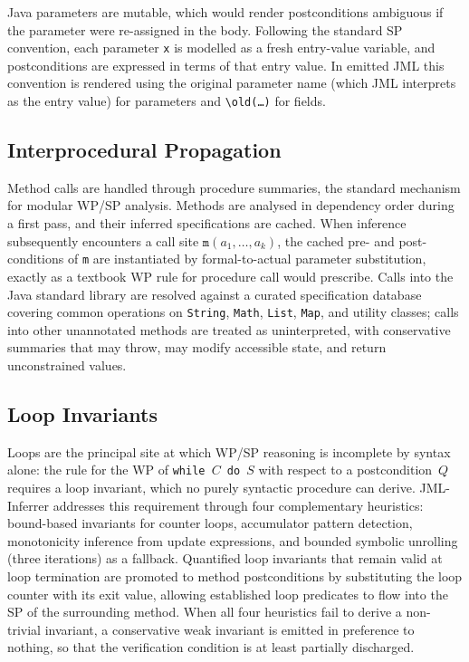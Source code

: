 \documentclass[11pt]{article}
\begin{document}
Java parameters are mutable, which would render postconditions ambiguous if the parameter were re-assigned in the body. Following the standard SP convention, each parameter \texttt{x} is modelled as a fresh entry-value variable, and postconditions are expressed in terms of that entry value. In emitted JML this convention is rendered using the original parameter name (which JML interprets as the entry value) for parameters and \texttt{\textbackslash old(\dots)} for fields.

\subsection{Interprocedural Propagation}
\label{subsec:proc-summaries}

Method calls are handled through procedure summaries, the standard mechanism for modular WP/SP analysis. Methods are analysed in dependency order during a first pass, and their inferred specifications are cached. When inference subsequently encounters a call site $\texttt{m}(a_1, \ldots, a_k)$, the cached pre- and post-conditions of \texttt{m} are instantiated by formal-to-actual parameter substitution, exactly as a textbook WP rule for procedure call would prescribe. Calls into the Java standard library are resolved against a curated specification database covering common operations on \texttt{String}, \texttt{Math}, \texttt{List}, \texttt{Map}, and utility classes; calls into other unannotated methods are treated as uninterpreted, with conservative summaries that may throw, may modify accessible state, and return unconstrained values.

\subsection{Loop Invariants}
\label{subsec:loop-mapping}

Loops are the principal site at which WP/SP reasoning is incomplete by syntax alone: the rule for the WP of \texttt{while $C$ do $S$} with respect to a postcondition~$Q$ requires a loop invariant, which no purely syntactic procedure can derive. JML-Inferrer addresses this requirement through four complementary heuristics: bound-based invariants for counter loops, accumulator pattern detection, monotonicity inference from update expressions, and bounded symbolic unrolling (three iterations) as a fallback. Quantified loop invariants that remain valid at loop termination are promoted to method postconditions by substituting the loop counter with its exit value, allowing established loop predicates to flow into the SP of the surrounding method. When all four heuristics fail to derive a non-trivial invariant, a conservative weak invariant is emitted in preference to nothing, so that the verification condition is at least partially discharged.
\end{document}
